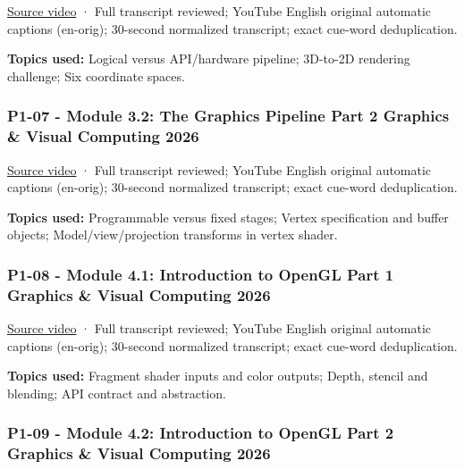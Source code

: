 \href{https://www.youtube.com/watch?v=QEiWsz7cmnw}{Source video} · Full transcript reviewed; YouTube English original automatic captions (en-orig); 30-second normalized transcript; exact cue-word deduplication.

\textbf{Topics used:} Logical versus API/hardware pipeline; 3D-to-2D rendering challenge; Six coordinate spaces.

\subsubsection{P1-07 - Module 3.2: The Graphics Pipeline Part 2 Graphics \& Visual Computing 2026}\label{04-visual-computing-ii-ch036-p1-07---module-3.2-the-graphics-pipeline-part-2-graphics-visual-computing-2026}

\hypertarget{04-visual-computing-ii-ch036-p1-07---module-3.2-the-graphics-pipeline-part-2-graphics-visual-computing-2026}{}

\href{https://www.youtube.com/watch?v=rRQiFwFzFJM}{Source video} · Full transcript reviewed; YouTube English original automatic captions (en-orig); 30-second normalized transcript; exact cue-word deduplication.

\textbf{Topics used:} Programmable versus fixed stages; Vertex specification and buffer objects; Model/view/projection transforms in vertex shader.

\subsubsection{P1-08 - Module 4.1: Introduction to OpenGL Part 1 Graphics \& Visual Computing 2026}\label{04-visual-computing-ii-ch036-p1-08---module-4.1-introduction-to-opengl-part-1-graphics-visual-computing-2026}

\hypertarget{04-visual-computing-ii-ch036-p1-08---module-4.1-introduction-to-opengl-part-1-graphics-visual-computing-2026}{}

\href{https://www.youtube.com/watch?v=I1VFptM0obM}{Source video} · Full transcript reviewed; YouTube English original automatic captions (en-orig); 30-second normalized transcript; exact cue-word deduplication.

\textbf{Topics used:} Fragment shader inputs and color outputs; Depth, stencil and blending; API contract and abstraction.

\subsubsection{P1-09 - Module 4.2: Introduction to OpenGL Part 2 Graphics \& Visual Computing 2026}\label{04-visual-computing-ii-ch036-p1-09---module-4.2-introduction-to-opengl-part-2-graphics-visual-computing-2026}

